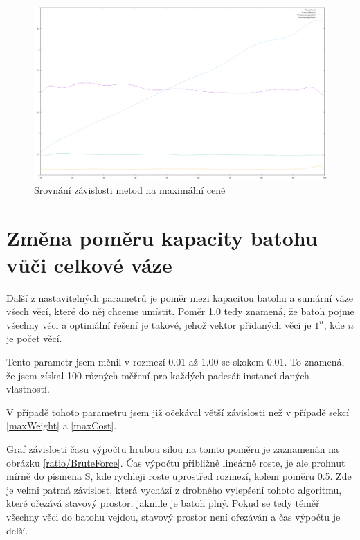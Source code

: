 \documentclass[12pt,a4paper]{article}
\begin{document}
\begin{figure}[H]
\begin{center}
\includegraphics[width=\textwidth]{maxCost/allExecTimes}
\caption{Srovnání závislosti metod na maximální ceně}
\label{maxCost/allExecTimes}
\end{center}
\end{figure}









\section{Změna poměru kapacity batohu vůči celkové váze}

Další z nastavitelných parametrů je poměr mezi kapacitou batohu a sumární váze všech věcí, které do něj chceme umístit. Poměr 1.0 tedy znamená, že batoh pojme všechny věci a optimální řešení je takové, jehož vektor přidaných věcí je $1^n$, kde $n$ je počet věcí.

Tento parametr jsem měnil v rozmezí 0.01 až 1.00 se skokem 0.01. To znamená, že jsem získal 100 různých měření pro každých padesát instancí daných vlastností. 

V případě tohoto parametru jsem již očekával větší závislosti než v případě sekcí \ref{maxWeight} a \ref{maxCost}.

Graf závislosti času výpočtu hrubou silou na tomto poměru je zaznamenán na obrázku \ref{ratio/BruteForce}. Čas výpočtu přibližně lineárně roste, je ale prohnut mírně do písmena S, kde rychleji roste uprostřed rozmezí, kolem poměru 0.5. Zde je velmi patrná závislost, která vychází z drobného vylepšení tohoto algoritmu, které ořezává stavový prostor, jakmile je batoh plný. Pokud se tedy téměř všechny věci do batohu vejdou, stavový prostor není ořezáván a čas výpočtu je delší.
\end{document}
